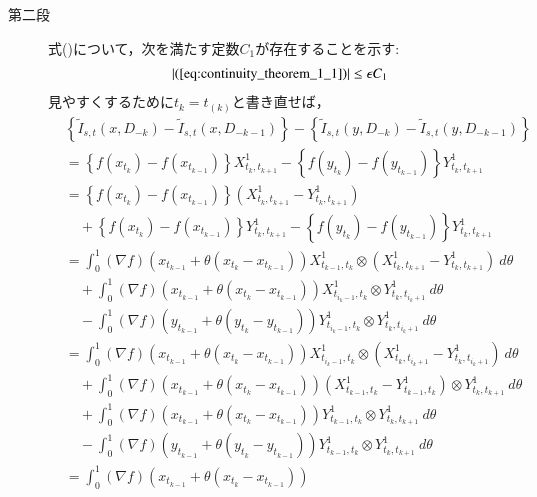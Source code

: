 \begin{prf}
\begin{description}
			\item[第二段]
				式()について，次を満たす定数$C_1$が存在することを示す:
				\begin{align}
					|(\refeq{eq:continuity_theorem_1_1})| \leq \epsilon C_1
					\label{eq:continuity_theorem_1_3}
				\end{align}
				見やすくするために$t_k = t_{(k)}$と書き直せば，
				\begin{align}
					&\left\{ \tilde{I}_{s,t}(x,D_{-k}) - \tilde{I}_{s,t}(x,D_{-k-1}) \right\} - 
						\left\{ \tilde{I}_{s,t}(y,D_{-k}) - \tilde{I}_{s,t}(y,D_{-k-1}) \right\} \\
					&=	\left\{ f(x_{t_k}) - f(x_{t_{k-1}}) \right\} X^1_{t_k,t_{k+1}}
						- \left\{ f(y_{t_k}) - f(y_{t_{k-1}}) \right\} Y^1_{t_k,t_{k+1}} \\
					&= \left\{ f(x_{t_k}) - f(x_{t_{k-1}}) \right\} \left( X^1_{t_k,t_{k+1}} - Y^1_{t_k,t_{k+1}} \right) \\
						&\quad +\left\{ f(x_{t_k}) - f(x_{t_{k-1}}) \right\} Y^1_{t_k,t_{k+1}} - \left\{ f(y_{t_k}) - f(y_{t_{k-1}}) \right\} Y^1_{t_k,t_{k+1}} \\
					&= \int_0^1 (\nabla f)( x_{t_{k-1}}+\theta ( x_{t_k}-x_{t_{k-1}} ))
						X^1_{t_{k-1},t_k} \otimes \left( X^1_{t_k,t_{k+1}} - Y^1_{t_k,t_{k+1}} \right)\ d\theta \\
						&\quad + \int_0^1 (\nabla f)( x_{t_{k-1}}+\theta ( x_{t_k}-x_{t_{k-1}} ))
						X^1_{t_{i_k-1},t_k} \otimes Y^1_{t_k,t_{i_k+1}}\ d\theta \\
						&\quad - \int_0^1 (\nabla f)( y_{t_{k-1}}+\theta ( y_{t_k}-y_{t_{k-1}} ))
						Y^1_{t_{i_k-1},t_k} \otimes Y^1_{t_k,t_{i_k+1}}\ d\theta \\
					&= \int_0^1 (\nabla f)( x_{t_{k-1}}+\theta ( x_{t_k}-x_{t_{k-1}} ))
						X^1_{t_{i_k-1},t_k} \otimes \left( X^1_{t_k,t_{i_k+1}} - Y^1_{t_k,t_{i_k+1}} \right)\ d\theta \\
						&\quad + \int_0^1 (\nabla f)( x_{t_{k-1}}+\theta ( x_{t_k}-x_{t_{k-1}} ))
						\left( X^1_{t_{k-1},t_k} - Y^1_{t_{k-1},t_k} \right) \otimes Y^1_{t_k,t_{k+1}}\ d\theta \\
						&\quad + \int_0^1 (\nabla f)( x_{t_{k-1}}+\theta ( x_{t_k}-x_{t_{k-1}} ))
						Y^1_{t_{k-1},t_k} \otimes Y^1_{t_k,t_{k+1}}\ d\theta \\
						&\quad - \int_0^1 (\nabla f)( y_{t_{k-1}}+\theta ( y_{t_k}-y_{t_{k-1}} ))
						Y^1_{t_{k-1},t_k} \otimes Y^1_{t_k,t_{k+1}}\ d\theta \\
					&= \int_0^1 (\nabla f)( x_{t_{k-1}}+\theta ( x_{t_k}-x_{t_{k-1}} ))

\end{align}
\end{description}
\end{prf}
